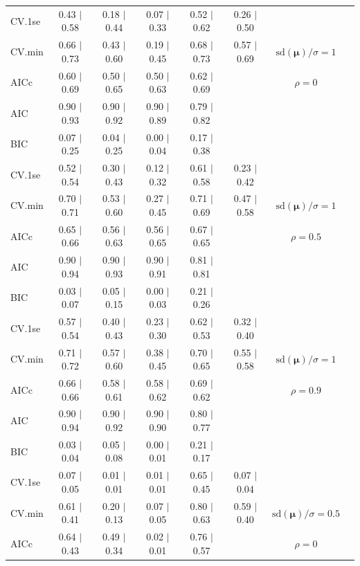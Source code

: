 \documentclass[12pt]{article}
\newcommand{\mr}[1]{\mathrm{#1}}
\newcommand{\bm}[1]{\mathbf{#1}}
\begin{document}
\begin{table}[p]
\begin{center}
\begin{tabular}{l*{6}{c}|r}
 \hline 
CV.1se & 0.43 $\mid$ 0.58 & 0.18 $\mid$ 0.44 & 0.07 $\mid$ 0.33 & 0.52 $\mid$ 0.62 & 0.26 $\mid$ 0.50 &\\
CV.min & 0.66 $\mid$ 0.73 & 0.43 $\mid$ 0.60 & 0.19 $\mid$ 0.45 & 0.68 $\mid$ 0.73 & 0.57 $\mid$ 0.69 &  $\mr{sd}(\bm{\mu})/\sigma=1$ \\
AICc & 0.60 $\mid$ 0.69 & 0.50 $\mid$ 0.65 & 0.50 $\mid$ 0.63 & 0.62 $\mid$ 0.69 & & $\rho=0$ \\
AIC & 0.90 $\mid$ 0.93 & 0.90 $\mid$ 0.92 & 0.90 $\mid$ 0.89 & 0.79 $\mid$ 0.82 & &  \\
BIC & 0.07 $\mid$ 0.25 & 0.04 $\mid$ 0.25 & 0.00 $\mid$ 0.04 & 0.17 $\mid$ 0.38 & & \\
 \hline 
CV.1se & 0.52 $\mid$ 0.54 & 0.30 $\mid$ 0.43 & 0.12 $\mid$ 0.32 & 0.61 $\mid$ 0.58 & 0.23 $\mid$ 0.42 &\\
CV.min & 0.70 $\mid$ 0.71 & 0.53 $\mid$ 0.60 & 0.27 $\mid$ 0.45 & 0.71 $\mid$ 0.69 & 0.47 $\mid$ 0.58 &  $\mr{sd}(\bm{\mu})/\sigma=1$ \\
AICc & 0.65 $\mid$ 0.66 & 0.56 $\mid$ 0.63 & 0.56 $\mid$ 0.65 & 0.67 $\mid$ 0.65 & & $\rho=0.5$ \\
AIC & 0.90 $\mid$ 0.94 & 0.90 $\mid$ 0.93 & 0.90 $\mid$ 0.91 & 0.81 $\mid$ 0.81 & &  \\
BIC & 0.03 $\mid$ 0.07 & 0.05 $\mid$ 0.15 & 0.00 $\mid$ 0.03 & 0.21 $\mid$ 0.26 & & \\
 \hline 
CV.1se & 0.57 $\mid$ 0.54 & 0.40 $\mid$ 0.43 & 0.23 $\mid$ 0.30 & 0.62 $\mid$ 0.53 & 0.32 $\mid$ 0.40 &\\
CV.min & 0.71 $\mid$ 0.72 & 0.57 $\mid$ 0.60 & 0.38 $\mid$ 0.45 & 0.70 $\mid$ 0.65 & 0.55 $\mid$ 0.58 &  $\mr{sd}(\bm{\mu})/\sigma=1$ \\
AICc & 0.66 $\mid$ 0.66 & 0.58 $\mid$ 0.61 & 0.58 $\mid$ 0.62 & 0.69 $\mid$ 0.62 & & $\rho=0.9$ \\
AIC & 0.90 $\mid$ 0.94 & 0.90 $\mid$ 0.92 & 0.90 $\mid$ 0.90 & 0.80 $\mid$ 0.77 & &  \\
BIC & 0.03 $\mid$ 0.04 & 0.05 $\mid$ 0.08 & 0.00 $\mid$ 0.01 & 0.21 $\mid$ 0.17 & & \\
 \hline 
CV.1se & 0.07 $\mid$ 0.05 & 0.01 $\mid$ 0.01 & 0.01 $\mid$ 0.01 & 0.65 $\mid$ 0.45 & 0.07 $\mid$ 0.04 &\\
CV.min & 0.61 $\mid$ 0.41 & 0.20 $\mid$ 0.13 & 0.07 $\mid$ 0.05 & 0.80 $\mid$ 0.63 & 0.59 $\mid$ 0.40 &  $\mr{sd}(\bm{\mu})/\sigma=0.5$ \\
AICc & 0.64 $\mid$ 0.43 & 0.49 $\mid$ 0.34 & 0.02 $\mid$ 0.01 & 0.76 $\mid$ 0.57 & & $\rho=0$ \\

\end{tabular}
\end{center}
\end{table}
\end{document}
